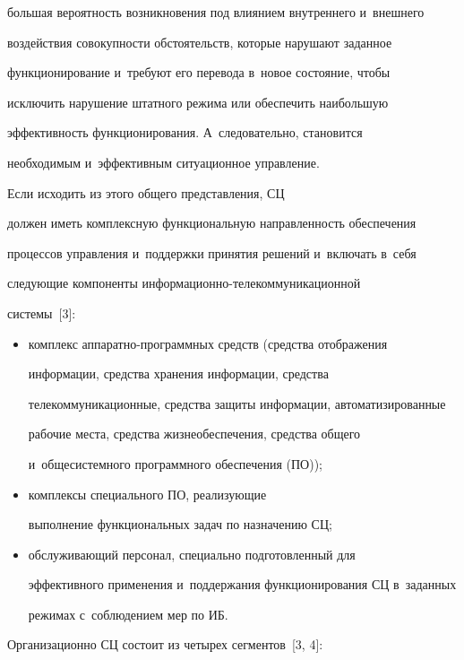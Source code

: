 большая вероятность возникновения под влиянием внутреннего и~внешнего 

воздействия совокупности обстоятельств, которые нарушают заданное 

функционирование и~требуют его перевода в~новое состояние, чтобы 

исключить нарушение штатного режима или обеспечить наибольшую 

эффективность функционирования. А~следовательно, становится 

необходимым и~эффективным ситуационное управление.

    

    Если исходить из этого общего представления, СЦ

должен иметь комплексную функциональную направленность обеспечения 

процессов управления и~поддержки принятия решений и~включать в~себя 

следующие компоненты ин\-фор\-ма\-ци\-он\-но-те\-ле\-ком\-му\-ни\-ка\-ци\-он\-ной 

сис\-те\-мы~[3]: 

    \begin{itemize}

\item  комплекс аппаратно-программных средств (средства отображения 

информации, средства хранения информации, средства 

телекоммуникационные, средства защиты информации, автоматизированные 

рабочие места, средства жизнеобеспечения, средства общего 

и~обще\-сис\-тем\-но\-го программного обеспечения (ПО));

    \item комплексы специального ПО, реализующие 

выполнение функциональных задач по назначению СЦ;

    \item обслуживающий персонал, специально подготовленный для 

эффективного применения и~поддержания функционирования СЦ в~заданных 

режимах с~соблюдением мер по ИБ. 

    \end{itemize}

    

    Организационно СЦ состоит из четырех сегментов~[3, 4]:

